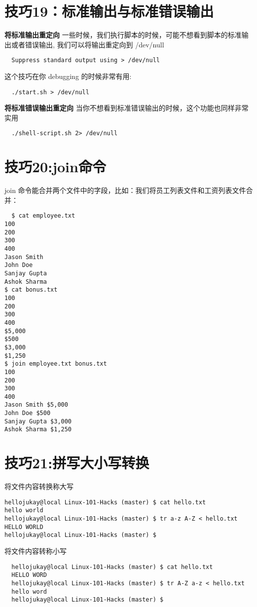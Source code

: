 \documentclass[UTF8]{ctexart}
\begin{document}
\section*{技巧19：标准输出与标准错误输出}
\textbf{将标准输出重定向} \newline
一些时候，我们执行脚本的时候，可能不想看到脚本的标准输出或者错误输出,
我们可以将输出重定向到 /dev/null
\begin{lstlisting}
  Suppress standard output using > /dev/null
\end{lstlisting}
这个技巧在你 debugging 的时候非常有用:
\begin{lstlisting}
  ./start.sh > /dev/null
\end{lstlisting}
\textbf{将标准错误输出重定向} \newline
当你不想看到标准错误输出的时候，这个功能也同样非常实用
\begin{lstlisting}
  ./shell-script.sh 2> /dev/null
\end{lstlisting}


\section*{技巧20:join命令}
join 命令能合并两个文件中的字段，比如：我们将员工列表文件和工资列表文件合并：
\begin{lstlisting}
  $ cat employee.txt
100
200
300
400
Jason Smith
John Doe
Sanjay Gupta
Ashok Sharma
$ cat bonus.txt
100
200
300
400
$5,000
$500
$3,000
$1,250
$ join employee.txt bonus.txt
100
200
300
400
Jason Smith $5,000
John Doe $500
Sanjay Gupta $3,000
Ashok Sharma $1,250
\end{lstlisting}


\section*{技巧21:拼写大小写转换}
将文件内容转换称大写
\begin{lstlisting}
hellojukay@local Linux-101-Hacks (master) $ cat hello.txt 
hello world
hellojukay@local Linux-101-Hacks (master) $ tr a-z A-Z < hello.txt 
HELLO WORLD
hellojukay@local Linux-101-Hacks (master) $ 
\end{lstlisting}
将文件内容转称小写
\begin{lstlisting}
  hellojukay@local Linux-101-Hacks (master) $ cat hello.txt 
  HELLO WORD
  hellojukay@local Linux-101-Hacks (master) $ tr A-Z a-z < hello.txt 
  hello word
  hellojukay@local Linux-101-Hacks (master) $ 
\end{lstlisting}
\end{document}
